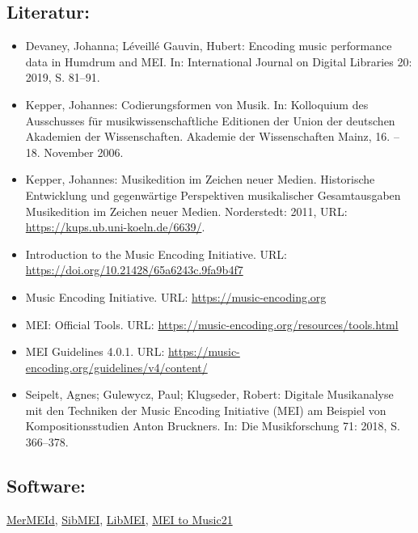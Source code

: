 \documentclass{article}
\begin{document}
        \subsection*{Literatur:}\begin{itemize}\item Devaney, Johanna; Léveillé Gauvin, Hubert: Encoding music performance data in Humdrum and
                              MEI. In: International Journal on Digital Libraries 20: 2019, S. 81–91.\item Kepper, Johannes: Codierungsformen von Musik. In: Kolloquium des Ausschusses für
                              musikwissenschaftliche Editionen der Union der deutschen Akademien der
                              Wissenschaften. Akademie der Wissenschaften Mainz, 16. – 18. November
                              2006.\item Kepper, Johannes: Musikedition im Zeichen neuer Medien. Historische
                              Entwicklung und gegenwärtige Perspektiven musikalischer
                              Gesamtausgaben Musikedition im Zeichen neuer Medien. Norderstedt: 2011, URL: \url{https://kups.ub.uni-koeln.de/6639/}.\item Introduction to the Music Encoding Initiative. URL: \url{https://doi.org/10.21428/65a6243c.9fa9b4f7}\item Music Encoding Initiative. URL: \url{https://music-encoding.org}\item MEI: Official Tools. URL: \url{https://music-encoding.org/resources/tools.html}\item MEI Guidelines 4.0.1. URL: \url{https://music-encoding.org/guidelines/v4/content/}\item Seipelt, Agnes; Gulewycz, Paul; Klugseder, Robert: Digitale Musikanalyse mit den Techniken der Music
                              Encoding Initiative (MEI) am Beispiel von Kompositionsstudien Anton
                              Bruckners. In: Die Musikforschung 71: 2018, S. 366–378.\end{itemize}\subsection*{Software:}\href{http://www5.kb.dk/en/nb/dcm/projekter/mermeid.html}{MerMEId}, \href{https://github.com/music-encoding/sibmei/releases}{SibMEI}, \href{https://github.com/DDMAL/libmei/}{LibMEI}, \href{http://web.mit.edu/music21/}{MEI to Music21
}
\end{document}
